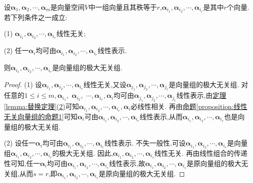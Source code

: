 \documentclass[../../main.tex]{subfiles}%
\begin{document}
\begin{proposition}\label{proposition:极大无关组的判定条件}
设\(\boldsymbol{\alpha}_1,\boldsymbol{\alpha}_2,\cdots,\boldsymbol{\alpha}_m\)是向量空间\(V\)中一组向量且其秩等于\(r\),\(\boldsymbol{\alpha}_{i_1},\boldsymbol{\alpha}_{i_2},\cdots,\boldsymbol{\alpha}_{i_r}\)是其中\(r\)个向量. 若下列条件之一成立:

(1) \(\boldsymbol{\alpha}_{i_1},\boldsymbol{\alpha}_{i_2},\cdots,\boldsymbol{\alpha}_{i_r}\)线性无关;

(2) 任一\(\boldsymbol{\alpha}_i\)均可由\(\boldsymbol{\alpha}_{i_1},\boldsymbol{\alpha}_{i_2},\cdots,\boldsymbol{\alpha}_{i_r}\)线性表示.

则\(\boldsymbol{\alpha}_{i_1},\boldsymbol{\alpha}_{i_2},\cdots,\boldsymbol{\alpha}_{i_r}\)是向量组的极大无关组.
\end{proposition}
\begin{proof}

(1) 设\(\boldsymbol{\alpha}_{i_1},\boldsymbol{\alpha}_{i_2},\cdots,\boldsymbol{\alpha}_{i_r}\)线性无关,又设\(\boldsymbol{\alpha}_{j_1},\boldsymbol{\alpha}_{j_2},\cdots,\boldsymbol{\alpha}_{j_r}\)是向量组的极大无关组. 对任意的\(1\leqslant  i\leqslant  m,\)$\boldsymbol{\alpha}_{i_1},$ $\boldsymbol{\alpha}_{i_2},$ $\cdots,$$\boldsymbol{\alpha}_{i_r},$$\boldsymbol{\alpha}_i$均可由\(\boldsymbol{\alpha}_{j_1},\boldsymbol{\alpha}_{j_2},\cdots,\boldsymbol{\alpha}_{j_r}\)线性表示,由\hyperref[lemma:替换定理]{定理\ref{lemma:替换定理}(2)}可知\(\boldsymbol{\alpha}_{i_1},\boldsymbol{\alpha}_{i_2},\cdots,\boldsymbol{\alpha}_{i_r},\boldsymbol{\alpha}_i\)必线性相关. 再由\hyperref[proposition:线性无关向量组的命题1]{命题\ref{proposition:线性无关向量组的命题1}}可知\(\boldsymbol{\alpha}_i\)可由\(\boldsymbol{\alpha}_{i_1},\boldsymbol{\alpha}_{i_2},\cdots,\boldsymbol{\alpha}_{i_r}\)线性表示,从而\(\boldsymbol{\alpha}_{i_1},\boldsymbol{\alpha}_{i_2},\cdots,\boldsymbol{\alpha}_{i_r}\)也是向量组的极大无关组.

(2) 设任一\(\boldsymbol{\alpha}_i\)均可由\(\boldsymbol{\alpha}_{i_1},\boldsymbol{\alpha}_{i_2},\cdots,\boldsymbol{\alpha}_{i_r}\)线性表示. 不失一般性,可设\(\boldsymbol{\alpha}_{i_1},\boldsymbol{\alpha}_{i_2},\cdots,\boldsymbol{\alpha}_{i_s}\)是向量组\(\boldsymbol{\alpha}_{i_1},\boldsymbol{\alpha}_{i_2},\cdots,\boldsymbol{\alpha}_{i_r}\)的极大无关组. 因此,\(\boldsymbol{\alpha}_{i_1},\boldsymbol{\alpha}_{i_2},\cdots,\boldsymbol{\alpha}_{i_s}\)线性无关. 再由线性组合的传递性可知,任一\(\boldsymbol{\alpha}_i\)均可由\(\boldsymbol{\alpha}_{i_1},\boldsymbol{\alpha}_{i_2},\cdots,\boldsymbol{\alpha}_{i_s}\)线性表示,故\(\boldsymbol{\alpha}_{i_1},\boldsymbol{\alpha}_{i_2},\cdots,\boldsymbol{\alpha}_{i_s}\)是原向量组的极大无关组,从而\(s = r\),即\(\boldsymbol{\alpha}_{i_1},\boldsymbol{\alpha}_{i_2},\cdots,\boldsymbol{\alpha}_{i_r}\)是原向量组的极大无关组.

\end{proof}
\end{document}
